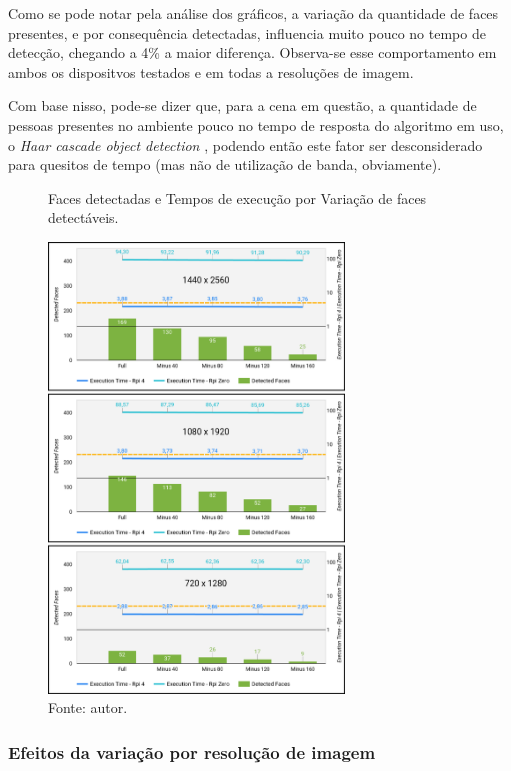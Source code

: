 Como se pode notar pela análise dos gráficos, a variação da quantidade de faces presentes, e por consequência detectadas, influencia muito pouco no tempo de detecção, chegando a 4\% a maior diferença. Observa-se esse comportamento em ambos os dispositvos testados e em todas a resoluções de imagem.

Com base nisso, pode-se dizer que, para a cena em questão, a quantidade de pessoas presentes no ambiente pouco no tempo de resposta do algoritmo em uso, o \textit{Haar cascade object detection} \cite{Viola2001}, podendo então este fator ser desconsiderado para quesitos de tempo (mas não de utilização de banda, obviamente).

\begin{figure}[H]
    \centering
    \caption[Faces detectadas e Tempos de execução por Variação de faces detectáveis.]{Faces detectadas e Tempos de execução por Variação de faces detectáveis.}
    \includegraphics[width=0.7\textwidth]{Cap4_Experimentos_Realizados/Figures/cena1_graficos_variacao_faces.jpg}
    \caption*{Fonte: autor.}
    \label{fig:dadosCena1_graficos_variacao_faces}
\end{figure}

\subsubsection{Efeitos da variação por resolução de imagem}

